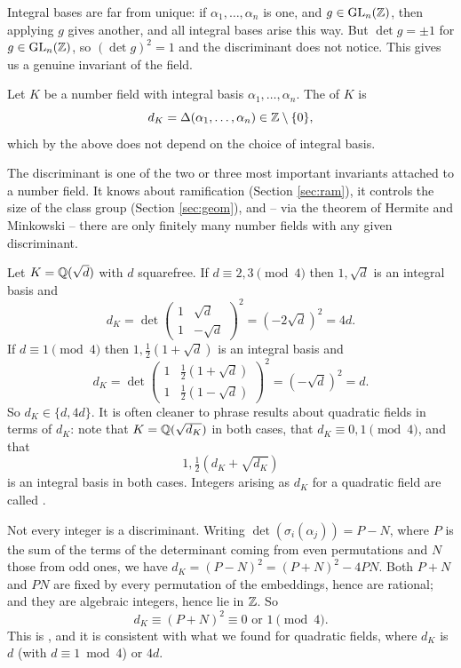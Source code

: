 \documentclass[a4paper]{scrartcl}
\begin{document}
Integral bases are far from unique: if $\alpha_1, \dots, \alpha_n$ is one, and $g \in \operatorname{GL}_n(\mathbb{Z})$, then applying $g$ gives another, and all integral bases arise this way. But $\det g = \pm 1$ for $g \in \operatorname{GL}_n(\mathbb{Z})$, so $(\det g)^2 = 1$ and the discriminant does not notice. This gives us a genuine invariant of the field.

\begin{definition}
	Let $K$ be a number field with integral basis $\alpha_1, \dots, \alpha_n$. The  of $K$ is
	$$d_K = \Delta(\alpha_1, \dots, \alpha_n) \in \mathbb{Z} \setminus \{0\},$$
	which by the above does not depend on the choice of integral basis.
\end{definition}

The discriminant is one of the two or three most important invariants attached to a number field. It knows about ramification (Section \ref{sec:ram}), it controls the size of the class group (Section \ref{sec:geom}), and -- via the theorem of Hermite and Minkowski -- there are only finitely many number fields with any given discriminant.

\begin{example}\label{ex:quaddisc}
	Let $K = \mathbb{Q}(\sqrt d)$ with $d$ squarefree. If $d \equiv 2,3 \pmod 4$ then $1, \sqrt d$ is an integral basis and
	$$d_K = \det\begin{pmatrix} 1 & \sqrt d \\ 1 & -\sqrt d\end{pmatrix}^2 = (-2\sqrt d)^2 = 4d.$$
	If $d \equiv 1 \pmod 4$ then $1, \tfrac12(1+\sqrt d)$ is an integral basis and
	$$d_K = \det\begin{pmatrix} 1 & \tfrac12(1+\sqrt d) \\ 1 & \tfrac12(1 - \sqrt d)\end{pmatrix}^2 = (-\sqrt d)^2 = d.$$
	So $d_K \in \{d, 4d\}$. It is often cleaner to phrase results about quadratic fields in terms of $d_K$: note that $K = \mathbb{Q}(\sqrt{d_K})$ in both cases, that $d_K \equiv 0, 1 \pmod 4$, and that
	$$1, \tfrac12\left(d_K + \sqrt{d_K}\right)$$
	is an integral basis in both cases. Integers arising as $d_K$ for a quadratic field are called .
\end{example}

\begin{remark}[Stickelberger]
	Not every integer is a discriminant. Writing $\det(\sigma_i(\alpha_j)) = P - N$, where $P$ is the sum of the terms of the determinant coming from even permutations and $N$ those from odd ones, we have $d_K = (P-N)^2 = (P+N)^2 - 4PN$. Both $P+N$ and $PN$ are fixed by every permutation of the embeddings, hence are rational; and they are algebraic integers, hence lie in $\mathbb{Z}$. So
	$$d_K \equiv (P+N)^2 \equiv 0 \text{ or } 1 \pmod 4.$$
	This is , and it is consistent with what we found for quadratic fields, where $d_K$ is $d$ (with $d \equiv 1 \bmod 4$) or $4d$.
\end{remark}
\end{document}

